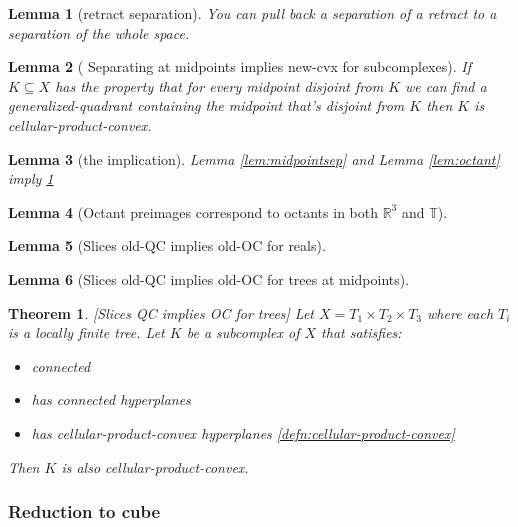 \documentclass{article}
\theoremstyle{mystyle}
\newtheorem{thm}{Theorem}[section]
\newtheorem{lem}{Lemma}[section]
\theoremstyle{remark}
\begin{document}
\begin{lem}
    [retract separation]
    You can pull back a separation of a retract to a separation of the whole space.
\end{lem}
\begin{lem}
	[\label{lem:midpointsep} Separating at midpoints implies new-cvx for subcomplexes]
	If \(K \subseteq X \) has the property that for every midpoint disjoint from \(K\) we can find a generalized-quadrant containing the midpoint that's disjoint from \(K\) then \(K\) is cellular-product-convex.
\end{lem}
\begin{lem}
	[the implication]
	Lemma \ref{lem:midpointsep} and Lemma \ref{lem:octant} imply \ref{thm:QCOC}
\end{lem}
\begin{lem}
	[\label{lem:octant}Octant preimages correspond to octants in both \(\mathbb{R}^3\) and \(\mathbb{T}\)]
\end{lem}
\begin{lem}
    [Slices old-QC implies old-OC for reals]


\end{lem}
\begin{lem}
    [Slices old-QC implies old-OC for trees at midpoints]
\end{lem}
\begin{thm}
	\label{thm:QCOC}
    [Slices QC implies OC for trees]
	Let \(X=T_{1} \times T_{2} \times T_{3}\) where each \(T_{i}\) is a locally finite tree. Let \(K\) be a subcomplex of \(X\) that satisfies: 
	\begin{itemize}
		\item connected
		\item has connected hyperplanes
		\item has cellular-product-convex hyperplanes \ref{defn:cellular-product-convex}
	\end{itemize}
Then \(K\) is also cellular-product-convex.
\end{thm}

\subsubsection{Reduction to cube}
\end{document}
